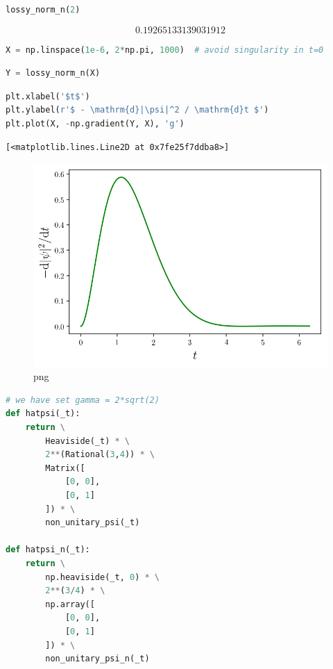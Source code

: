 \begin{lstlisting}[language=Python]
lossy_norm_n(2)
\end{lstlisting}

\[0.19265133139031912\]

\begin{lstlisting}[language=Python]
X = np.linspace(1e-6, 2*np.pi, 1000)  # avoid singularity in t=0
\end{lstlisting}

\begin{lstlisting}[language=Python]
Y = lossy_norm_n(X)
\end{lstlisting}

\begin{lstlisting}[language=Python]
plt.xlabel('$t$')
plt.ylabel(r'$ - \mathrm{d}|\psi|^2 / \mathrm{d}t $')
plt.plot(X, -np.gradient(Y, X), 'g')
\end{lstlisting}

\begin{lstlisting}
[<matplotlib.lines.Line2D at 0x7fe25f7ddba8>]
\end{lstlisting}

\begin{figure}
\centering
\includegraphics[width=0.6\linewidth]{output_46_1.png}
\caption[]{png}
\end{figure}

\begin{lstlisting}[language=Python]
# we have set gamma = 2*sqrt(2)
def hatpsi(_t):
    return \
        Heaviside(_t) * \
        2**(Rational(3,4)) * \
        Matrix([
            [0, 0],
            [0, 1]
        ]) * \
        non_unitary_psi(_t)
        
def hatpsi_n(_t):
    return \
        np.heaviside(_t, 0) * \
        2**(3/4) * \
        np.array([
            [0, 0],
            [0, 1]
        ]) * \
        non_unitary_psi_n(_t)
        
        
    
\end{lstlisting}

